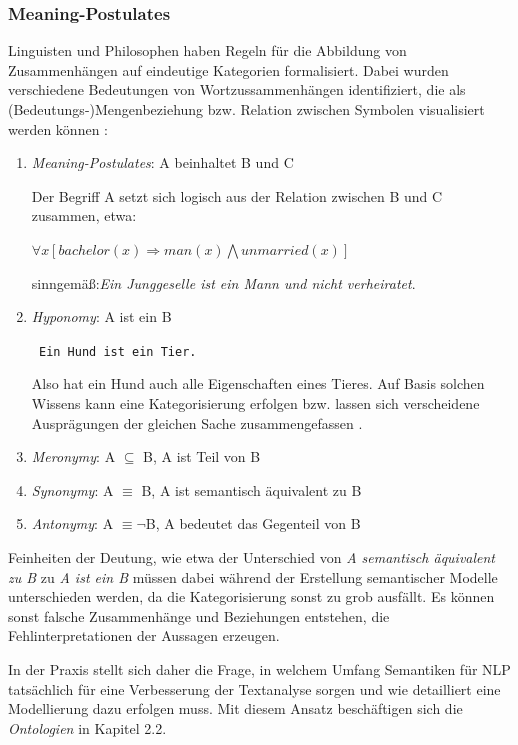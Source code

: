 \documentclass[12pt]{report}
\begin{document}
\subsubsection{Meaning-Postulates}
Linguisten und Philosophen haben Regeln für die Abbildung von Zusammenhängen auf eindeutige Kategorien formalisiert. Dabei wurden verschiedene Bedeutungen von Wortzussammenhängen identifiziert, die als (Bedeutungs-)Mengenbeziehung bzw. Relation zwischen Symbolen visualisiert werden können \cite{car52}:

\begin{enumerate}
\item \textit{Meaning-Postulates}: A beinhaltet B und C

Der Begriff A setzt sich logisch aus der Relation zwischen B und C zusammen, etwa:

$\forall x[bachelor(x)\Rightarrow man(x)\bigwedge unmarried(x)]$

sinngemäß:\glqq \textit{Ein Junggeselle ist ein Mann und nicht verheiratet}.\grqq

\item \textit{Hyponomy}: A ist ein B

\tt
Ein Hund ist ein Tier. 
\rm

Also hat ein Hund auch alle Eigenschaften eines Tieres. Auf Basis solchen Wissens kann eine Kategorisierung erfolgen bzw. lassen sich verscheidene Ausprägungen der gleichen Sache zusammengefassen \cite{rs18}.

\item \textit{Meronymy}: A $\subseteq$ B, A ist Teil von B

\item \textit{Synonymy}: A $\equiv$ B, A ist semantisch äquivalent zu B

\item \textit{Antonymy}: A $\equiv \neg$B, A bedeutet das Gegenteil von B
\end{enumerate}

Feinheiten der Deutung, wie etwa der Unterschied von \glqq \textit{A semantisch äquivalent zu B}\grqq{} zu \glqq \textit{A ist ein B}\grqq{} müssen dabei während der Erstellung semantischer Modelle unterschieden werden, da die Kategorisierung sonst zu grob ausfällt. Es können sonst falsche Zusammenhänge und Beziehungen entstehen, die Fehlinterpretationen der Aussagen erzeugen.

In der Praxis stellt sich daher die Frage, in welchem Umfang Semantiken für NLP tatsächlich für eine Verbesserung der Textanalyse sorgen und wie detailliert eine Modellierung dazu erfolgen muss. Mit diesem Ansatz beschäftigen sich die \textit{Ontologien} in Kapitel 2.2.
\end{document}

